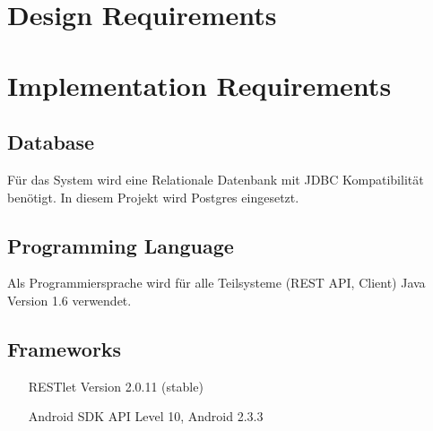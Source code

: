 \documentclass[10pt,a4paper]{scrartcl}
\begin{document}
\section{Design Requirements}
\section{Implementation Requirements}
\subsection{Database}
Für das System wird eine Relationale Datenbank mit JDBC Kompatibilität benötigt.
In diesem Projekt wird Postgres eingesetzt.
\subsection{Programming Language}
Als Programmiersprache wird für alle Teilsysteme (REST API, Client) Java Version 1.6 verwendet.
\subsection{Frameworks}
\begin{enumerate}
\item[RESTlet] Version 2.0.11 (stable)
\item[Android SDK] API Level 10, Android 2.3.3 
\end{enumerate}
\end{document}
